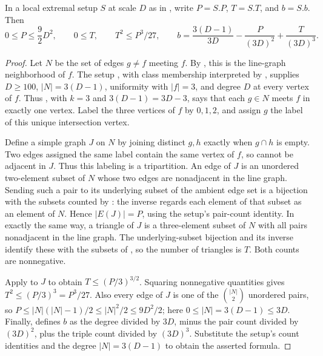\begin{helper}
In a local extremal setup $S$ at scale $D$ as in
, write $P=S.P$, $T=S.T$,
and $b=S.b$. Then
\[
0\le P\le\frac92D^2,\qquad 0\le T,\qquad T^2\le P^3/27,
\qquad
b=\frac{3(D-1)}{3D}-\frac{P}{(3D)^2}+\frac{T}{(3D)^3}.
\]
\end{helper}
\begin{proof}
Let $N$ be the set of edges $g\ne f$ meeting $f$. By
, this is the line-graph neighborhood of $f$.
The setup , with class membership
interpreted by , supplies
$D\ge100$, $|N|=3(D-1)$, uniformity with $|f|=3$, and degree $D$
at every vertex of $f$. Thus
, with $k=3$
and $3(D-1)=3D-3$, says that each $g\in N$ meets $f$ in exactly one
vertex. Label the three vertices of $f$ by $0,1,2$, and assign $g$ the
label of this unique intersection vertex.

Define a simple graph $J$ on $N$ by joining distinct $g,h$ exactly when
$g\cap h$ is empty. Two edges assigned the same label contain the same
vertex of $f$, so cannot be adjacent in $J$. Thus this labeling is a
tripartition. An edge of $J$ is an unordered two-element subset of $N$
whose two edges are nonadjacent in the line graph. Sending such a pair
to its underlying subset of the ambient edge set is a bijection with
the subsets counted by : the inverse
regards each element of that subset as an element of $N$. Hence
$|E(J)|=P$, using the setup's pair-count identity. In exactly the same
way, a triangle of $J$ is a three-element subset of $N$ with all pairs
nonadjacent in the line graph. The underlying-subset bijection and its
inverse identify these with the subsets of
, so the number of triangles is $T$.
Both counts are nonnegative.

Apply  to $J$ to obtain
$T\le(P/3)^{3/2}$. Squaring nonnegative quantities gives
$T^2\le(P/3)^3=P^3/27$. Also every edge of $J$ is one of the
$\binom{|N|}{2}$ unordered pairs, so
$P\le |N|(|N|-1)/2\le |N|^2/2\le9D^2/2$; here
$0\le|N|=3(D-1)\le3D$.
Finally,  defines $b$ as the degree divided by
$3D$, minus the pair count divided by $(3D)^2$, plus the triple count
divided by $(3D)^3$. Substitute the setup's count identities and
the degree $|N|=3(D-1)$ to obtain the asserted formula.
\end{proof}
